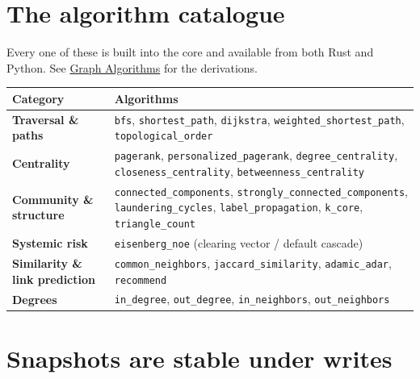 \documentclass[
  11pt,
  openany]{book}
\begin{document}
\section{The algorithm catalogue}\label{the-algorithm-catalogue}

Every one of these is built into the core and available from both Rust
and Python. See \href{../graph/algorithms.md}{Graph Algorithms} for the
derivations.

\begin{longtable}[]{@{}
  >{\raggedright\arraybackslash}p{}
  >{\raggedright\arraybackslash}p{}@{}}
\toprule\noalign{}
\begin{minipage}[b]{\linewidth}\raggedright
Category
\end{minipage} & \begin{minipage}[b]{\linewidth}\raggedright
Algorithms
\end{minipage} \\
\midrule\noalign{}
\endhead
\bottomrule\noalign{}
\endlastfoot
\textbf{Traversal \& paths} & \texttt{bfs}, \texttt{shortest\_path},
\texttt{dijkstra}, \texttt{weighted\_shortest\_path},
\texttt{topological\_order} \\
\textbf{Centrality} & \texttt{pagerank},
\texttt{personalized\_pagerank}, \texttt{degree\_centrality},
\texttt{closeness\_centrality}, \texttt{betweenness\_centrality} \\
\textbf{Community \& structure} & \texttt{connected\_components},
\texttt{strongly\_connected\_components}, \texttt{laundering\_cycles},
\texttt{label\_propagation}, \texttt{k\_core},
\texttt{triangle\_count} \\
\textbf{Systemic risk} & \texttt{eisenberg\_noe} (clearing vector /
default cascade) \\
\textbf{Similarity \& link prediction} & \texttt{common\_neighbors},
\texttt{jaccard\_similarity}, \texttt{adamic\_adar},
\texttt{recommend} \\
\textbf{Degrees} & \texttt{in\_degree}, \texttt{out\_degree},
\texttt{in\_neighbors}, \texttt{out\_neighbors} \\
\end{longtable}

\section{Snapshots are stable under
writes}\label{snapshots-are-stable-under-writes}
\end{document}
